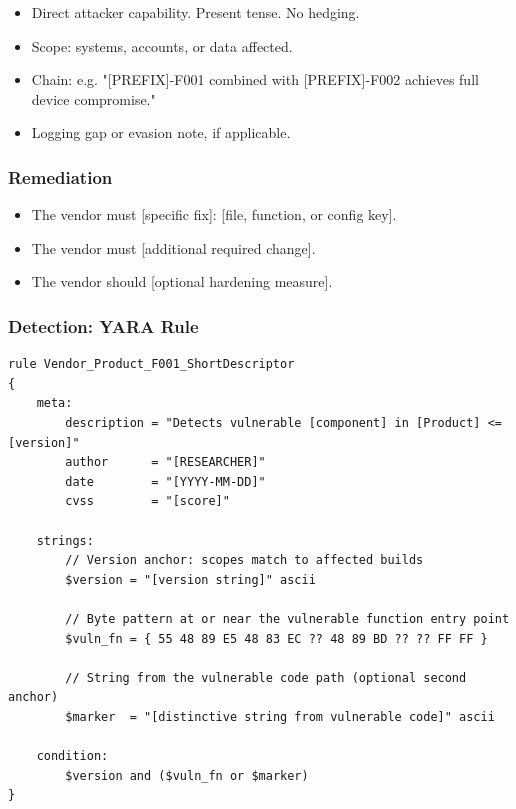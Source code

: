 \documentclass[11pt,a4paper]{article}
\newcommand{\ph}[1]{\lbrack#1\rbrack}
\begin{document}
\begin{itemize}[noitemsep]
\item \ph{Direct attacker capability. Present tense. No hedging.}
\item \ph{Scope: systems, accounts, or data affected.}
\item \ph{Chain: e.g. "[PREFIX]-F001 combined with [PREFIX]-F002 achieves full device compromise."}
\item \ph{Logging gap or evasion note, if applicable.}
\end{itemize}

\subsubsection{Remediation}

%

\begin{itemize}[noitemsep]
\item \ph{The vendor must [specific fix]: [file, function, or config key].}
\item \ph{The vendor must [additional required change].}
\item \ph{The vendor should [optional hardening measure].}
\end{itemize}

\subsubsection{Detection: YARA Rule}

\begin{lstlisting}[style=yara]
rule Vendor_Product_F001_ShortDescriptor
{
    meta:
        description = "Detects vulnerable [component] in [Product] <= [version]"
        author      = "[RESEARCHER]"
        date        = "[YYYY-MM-DD]"
        cvss        = "[score]"

    strings:
        // Version anchor: scopes match to affected builds
        $version = "[version string]" ascii

        // Byte pattern at or near the vulnerable function entry point
        $vuln_fn = { 55 48 89 E5 48 83 EC ?? 48 89 BD ?? ?? FF FF }

        // String from the vulnerable code path (optional second anchor)
        $marker  = "[distinctive string from vulnerable code]" ascii

    condition:
        $version and ($vuln_fn or $marker)
}
\end{lstlisting}
\end{document}
